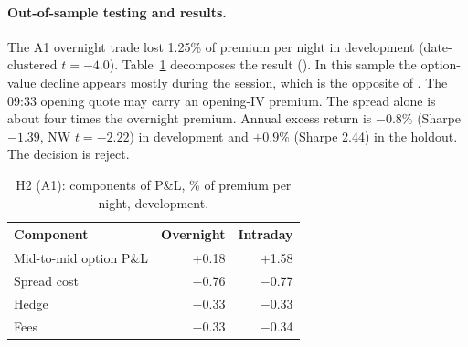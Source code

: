 \documentclass[../main.tex]{subfiles}
\begin{document}
\paragraph{Out-of-sample testing and results.}
The A1 overnight trade lost 1.25\% of premium per night in development (date-clustered $t = -4.0$). Table~\ref{tab:h2} decomposes the result (). In this sample the option-value decline appears mostly during the session, which is the opposite of \citet{muravyevni2020}. The 09:33 opening quote may carry an opening-IV premium. The spread alone is about four times the overnight premium. Annual excess return is $-0.8\%$ (Sharpe $-1.39$, NW $t=-2.22$) in development and $+0.9\%$ (Sharpe 2.44) in the holdout. The decision is reject.

\begin{table}[tbp]
\centering\small
\caption{H2 (A1): components of P\&L, \% of premium per night, development.}\label{tab:h2}
\begin{tabular}{@{}lrr@{}}
\toprule
Component & Overnight & Intraday \\
\midrule
Mid-to-mid option P\&L & $+$0.18 & $+$1.58 \\
Spread cost & $-$0.76 & $-$0.77 \\
Hedge & $-$0.33 & $-$0.33 \\
Fees & $-$0.33 & $-$0.34 \\
\bottomrule
\end{tabular}
\end{table}

\end{document}
